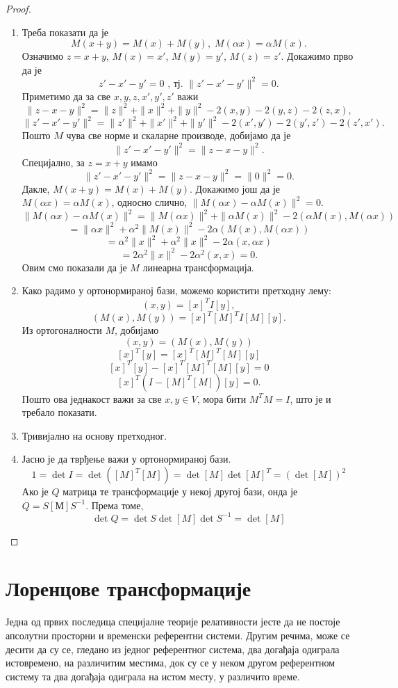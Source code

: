 \documentclass{report}
\theoremstyle{plain}
\theoremstyle{definition}
\begin{document}
\begin{proof}
\begin{enumerate}
  \item Треба показати да је
  $$M(x+y) = M(x)+M(y), \; M(\alpha x) = \alpha M(x).$$
  Означимо $z = x+y$, $M(x)=x'$, $M(y)=y'$, $M(z)=z'$. Докажимо прво да је
  $$z'-x'-y' = 0 \text{ , тј. } \|z'-x'-y'\|^2 = 0.$$
  Приметимо да за све $x, y, z, x', y', z'$ важи
  $$\|z-x-y\|^2 = \|z\|^2+\|x\|^2+\|y\|^2 - 2(x, y) -2(y, z) - 2(z, x),$$
  $$\|z'-x'-y'\|^2 = \|z'\|^2+\|x'\|^2+\|y'\|^2 - 2(x', y') -2(y', z') - 2(z', x').$$
  Пошто $M$ чува све норме и скаларне производе, добијамо да је
  $$\|z'-x'-y'\|^2 = \|z-x-y\|^2.$$
  Специјално, за $z=x+y$ имамо
  $$\|z'-x'-y'\|^2 = \|z-x-y\|^2 = \|0\|^2 = 0.$$
  Дакле, $M(x+y) = M(x)+M(y)$. Докажимо још да је $M(\alpha x) = \alpha M(x)$, односно слично, $\|M(\alpha x) - \alpha M(x)\|^2 = 0$.
  $$\|M(\alpha x) - \alpha M(x)\|^2 = \|M(\alpha x)\|^2 + \|\alpha M(x)\|^2 - 2(\alpha M(x), M(\alpha x))$$
  $$ = \|\alpha x\|^2 + \alpha^2 \|M(x)\|^2 - 2\alpha(M(x), M(\alpha x))$$
  $$ = \alpha^2\|x\|^2 + \alpha^2 \|x\|^2 - 2\alpha(x, \alpha x)$$
  $$ = 2\alpha^2\|x\|^2 - 2\alpha^2 (x, x) = 0.$$
  Овим смо показали да је $M$ линеарна трансформација.
  \item Како радимо у ортонормираној бази, можемо користити претходну лему:
  $$(x, y) = [x]^TI[y],$$
  $$(M(x), M(y)) = [x]^T[M]^TI[M][y].$$
  Из ортогоналности $M$, добијамо
  $$(x, y) = (M(x), M(y))$$
  $$[x]^T[y] = [x]^T[M]^T[M][y]$$
  $$[x]^T[y] - [x]^T[M]^T[M][y] = 0$$
  $$[x]^T(I-[M]^T[M])[y] = 0.$$
  Пошто ова једнакост важи за све $x, y\in V$, мора бити $M^TM = I$, што је и требало показати.
  \item Тривијално на основу претходног.
  \item Јасно је да тврђење важи у ортонормираној бази.
  $$1 = \det I = \det([M]^T[M]) = \det [M] \det {[M]^T} = (\det [M])^2$$
  Ако је $Q$ матрица те трансформације у некој другој бази, онда је $Q = S[М]S^{-1}$. Према томе,
  $$\det Q = \det S \det [M] \det S^{-1} = \det [M]$$
\end{enumerate}
\end{proof}

\section{Лоренцове трансформације}

Једна од првих последица специјалне теорије релативности јесте да не постоје апсолутни просторни и временски референтни системи. Другим речима, може се десити да су се, гледано из једног референтног система, два догађаја одиграла истовремено, на различитим местима, док су се у неком другом референтном систему та два догађаја одиграла на истом месту, у различито време.
\end{document}
